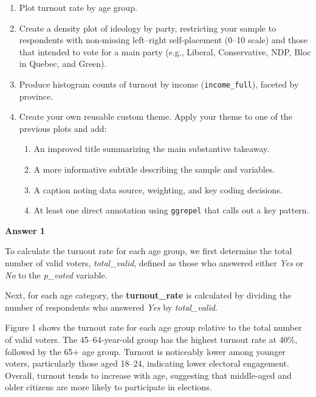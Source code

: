\documentclass[12pt,letterpaper]{article}
\begin{document}
\begin{enumerate}
	\item Plot turnout rate by age group.
	\item Create a density plot of ideology by party, restricting your sample to respondents with non‑missing left–right self‑placement (0–10 scale) and those that intended to vote for a main party (e.g., Liberal, Conservative, NDP, Bloc in Quebec, and Green).
	\item Produce histogram counts of turnout by income (\texttt{income\_full}), faceted by province.
	\item Create your own reusable custom theme. Apply your theme to one of the previous plots and add:
	\begin{enumerate}
		\item An improved title summarizing the main substantive takeaway.
		\item A more informative subtitle describing the sample and variables.
		\item A caption noting data source, weighting, and key coding decisions.
		\item At least one direct annotation using \texttt{ggrepel} that calls out a key pattern.
	\end{enumerate}

\end{enumerate}

\vspace{1cm}

\noindent\textbf{Answer 1}\\
\vspace{0.5cm}

\noindent To calculate the turnout rate for each age group, we first determine the total number of valid voters, \emph{total\_valid}, defined as those who answered either \emph{Yes} or \emph{No} to the \emph{p\_voted} variable.

\noindent Next, for each age category, the \textbf{turnout\_rate} is calculated by dividing the number of respondents who answered \emph{Yes} by \emph{total\_valid}.

\vspace{0.5cm}


\vspace{0.5cm}

\noindent Figure 1 shows the turnout rate for each age group relative to the total number of valid voters. The 45–64-year-old group has the highest turnout rate at 40\%, followed by the 65+ age group. Turnout is noticeably lower among younger voters, particularly those aged 18–24, indicating lower electoral engagement. Overall, turnout tends to increase with age, suggesting that middle-aged and older citizens are more likely to participate in elections.
\end{document}
